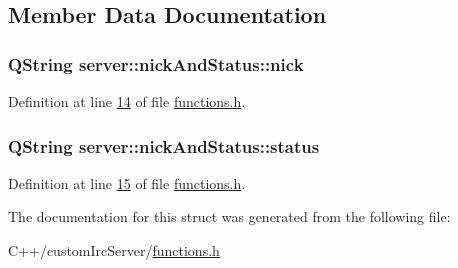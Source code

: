 \subsection{Member Data Documentation}
\hypertarget{structserver_1_1nick_and_status_a891d63cf912fdaa75ad5bac58da22230}{
\subsubsection[{nick}]{\setlength{\rightskip}{0pt plus 5cm}Q\-String server\-::nick\-And\-Status\-::nick}}\label{da/d6a/structserver_1_1nick_and_status_a891d63cf912fdaa75ad5bac58da22230}


Definition at line \hyperlink{functions_8h_source_l00014}{14} of file \hyperlink{functions_8h_source}{functions.\-h}.

\hypertarget{structserver_1_1nick_and_status_a33c2bc84bed373bf34f66ebf1f318fc0}{
\subsubsection[{status}]{\setlength{\rightskip}{0pt plus 5cm}Q\-String server\-::nick\-And\-Status\-::status}}\label{da/d6a/structserver_1_1nick_and_status_a33c2bc84bed373bf34f66ebf1f318fc0}


Definition at line \hyperlink{functions_8h_source_l00015}{15} of file \hyperlink{functions_8h_source}{functions.\-h}.



The documentation for this struct was generated from the following file\-:\begin{DoxyCompactItemize}
\item 
C++/custom\-Irc\-Server/\hyperlink{functions_8h}{functions.\-h}\end{DoxyCompactItemize}
